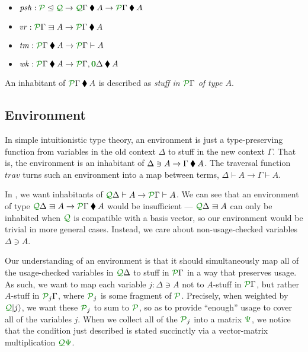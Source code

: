 \documentclass[submission,copyright,creativecommons]{eptcs}
\begin{document}
\begin{itemize}
  \item
    $\mathit{psh} : \resctx P \subres \resctx Q \to
    \ctx{\Gamma}{Q} \kitrel A \to \ctx{\Gamma}{P} \kitrel A$
  \item $\mathit{vr} : \ctx{\Gamma}{P} \lvar A \to
    \ctx{\Gamma}{P} \kitrel A$
  \item $\mathit{tm} : \ctx{\Gamma}{P} \kitrel A \to
    \ctx{\Gamma}{P} \vdash A$
  \item $\mathit{wk} : \ctx{\Gamma}{P} \kitrel A \to
    \ctx{\Gamma}{P}, \ctx{\Delta}{\vct 0} \kitrel A$
\end{itemize}

An inhabitant of $\ctx{\Gamma}{P} \kitrel A$ is described as
\emph{stuff in $\ctx{\Gamma}{P}$ of type $A$}.

\subsection{Environment}

In simple intuitionistic type theory, an environment is just a type-preserving
function from variables in the old context $\Delta$ to stuff in the new context
$\Gamma$.
That is, the environment is an inhabitant of
$\Delta \ni A \to \Gamma \mathbin{\blacklozenge} A$.
The traversal function $\mathit{trav}$ turns such an environment into a map
between terms, $\Delta \vdash A \to \Gamma \vdash A$.

In \name, we want inhabitants of
$\ctx{\Delta}{Q} \vdash A \to \ctx{\Gamma}{P} \vdash A$.
We can see that an environment of type
$\ctx{\Delta}{Q} \lvar A \to \ctx{\Gamma}{P} \kitrel A$ would
be insufficient --- $\ctx{\Delta}{Q} \lvar A$ can only be inhabited when
$\resctx Q$ is compatible with a basis vector, so our environment would be
trivial in more general cases.
Instead, we care about non-usage-checked variables $\Delta \ni A$.

Our understanding of an environment is that it should simultaneously map all of
the usage-checked variables in $\ctx{\Delta}{Q}$ to stuff in $\ctx{\Gamma}{P}$
in a way that preserves usage.
As such, we want to map each variable $j : \Delta \ni A$ not to $A$-stuff in
$\ctx{\Gamma}{P}$, but rather $A$-stuff in $\resctx P_j\Gamma$,
where $\resctx P_j$ is some fragment of $\resctx P$.
Precisely, when weighted by $\resctx Q\lvert j \rangle$, we want these
$\resctx P_j$ to sum to $\resctx P$, so as to provide ``enough'' usage to cover
all of the variables $j$.
When we collect all of the $\resctx P_j$ into a matrix $\rescomment\Psi$, we
notice that the condition just described is stated succinctly via a
vector-matrix multiplication $\resctx Q\rescomment\Psi$.
\end{document}
